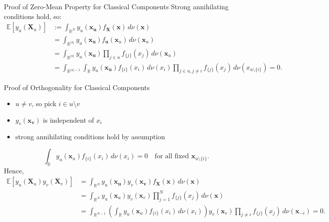 \begin{frame}{Proof of Zero-Mean Property for Classical Components}
  Strong annihilating conditions hold, so:
  \begin{align*}
    \mathbb{E}[y_u(\boldsymbol{X}_u)] &:= \int_{\mathbb{R}^{N}} y_u(\boldsymbol{x_u}) f_{\boldsymbol{X}}(\boldsymbol{x}) \, d\nu (\boldsymbol{x}) \\[0.5em]
    &= \int_{\mathbb{R}^{|u|}} y_u(\boldsymbol{x_u}) f_{\boldsymbol{u}}(\boldsymbol{x}_u) \, d\nu (\boldsymbol{x}_u) \\[0.5em]
    &= \int_{\mathbb{R}^{|u|}} y_u(\boldsymbol{x_u}) \prod_{j \in u} f_{\{j\}}(x_j) \, d\nu (\boldsymbol{x}_u) \\[0.5em]
    &= \int_{\mathbb{R}^{|u|-1}} \int_{\mathbb{R}} y_u(\boldsymbol{x_u}) f_{\{i\}}(x_i) \, d\nu(x_i) \prod_{j \in u, j \neq i} f_{\{j\}}(x_j) \, d\nu (x_{u \setminus \{i\}}) = 0.
\end{align*}

\end{frame}

\begin{frame}{Proof of Orthogonality for Classical Components}
  \begin{itemize}
    \item $u \neq v$, so pick $i \in u \setminus v$
    \item $y_v(\boldsymbol{x_v})$ is independent of $x_i$
    \item strong annihilating conditions hold by assumption
  \end{itemize}
\[
    \int_{\mathbb{R}} y_u(\boldsymbol{x}_u) f_{\{i\}}(x_i)\,d\nu(x_i) = 0
    \quad \text{for all fixed } \boldsymbol{x}_{u\setminus \{i\}}.
\]
Hence,
\begin{align*}
    \mathbb{E}[y_u(\boldsymbol{X}_u) y_v(\boldsymbol{X}_v)] &= \int_{\mathbb{R}^{N}} y_u(\boldsymbol{x_u}) y_v(\boldsymbol{x_v}) f_{\boldsymbol{X}}(\boldsymbol{x}) \, d\nu (\boldsymbol{x}) \\
    &= \int_{\mathbb{R}^{N}} y_u(\boldsymbol{x}_u) y_v(\boldsymbol{x}_v)
       \prod_{j=1}^N f_{\{j\}}(x_j)\, d\nu(\boldsymbol{x}) \\
    &= \int_{\mathbb{R}^{N-1}}
        \left(\int_{\mathbb{R}} y_u(\boldsymbol{x}_u) f_{\{i\}}(x_i)\,d\nu(x_i)\right)
        y_v(\boldsymbol{x}_v)\prod_{j \neq i} f_{\{j\}}(x_j)\,d\nu(\boldsymbol{x}_{-i}) = 0.
\end{align*}
\end{frame}

